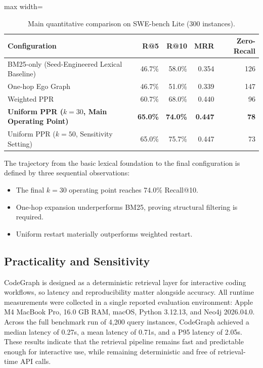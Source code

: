 \begin{table}[htbp]
    \centering
    \caption{Main quantitative comparison on SWE-bench Lite (300 instances).}
    \label{tab:main-results}
    \begin{adjustbox}{max width=\linewidth}
    \begin{tabular}{lrrrr}
        \toprule
        \textbf{Configuration} & \textbf{R@5} & \textbf{R@10} & \textbf{MRR} & \textbf{Zero-Recall} \\
        \midrule
        BM25-only (Seed-Engineered Lexical Baseline) & 46.7\% & 58.0\% & 0.354 & 126 \\
        One-hop Ego Graph & 46.7\% & 51.0\% & 0.339 & 147 \\
        Weighted PPR & 60.7\% & 68.0\% & 0.440 & 96 \\
        \textbf{Uniform PPR ($k=30$, Main Operating Point)} & \textbf{65.0\%} & \textbf{74.0\%} & \textbf{0.447} & \textbf{78} \\
        Uniform PPR ($k=50$, Sensitivity Setting) & 65.0\% & 75.7\% & 0.447 & 73 \\
        \bottomrule
    \end{tabular}
    \end{adjustbox}
\end{table}

The trajectory from the basic lexical foundation to the final configuration is defined by three sequential observations:
\begin{itemize}
    \item The final $k=30$ operating point reaches 74.0\% Recall@10.
    \item One-hop expansion underperforms BM25, proving structural filtering is required.
    \item Uniform restart materially outperforms weighted restart.
\end{itemize}

\subsection{Practicality and Sensitivity}

CodeGraph is designed as a deterministic retrieval layer for interactive coding workflows, so latency and reproducibility matter alongside accuracy. All runtime measurements were collected in a single reported evaluation environment: Apple M4 MacBook Pro, 16.0 GB RAM, macOS, Python 3.12.13, and Neo4j 2026.04.0. Across the full benchmark run of 4,200 query instances, CodeGraph achieved a median latency of 0.27s, a mean latency of 0.71s, and a P95 latency of 2.05s. These results indicate that the retrieval pipeline remains fast and predictable enough for interactive use, while remaining deterministic and free of retrieval-time API calls.

